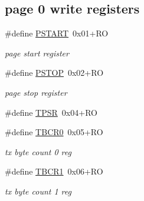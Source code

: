 \subsection*{page 0 write registers}
\begin{DoxyCompactItemize}
\item 
\mbox{\label{group__gumstix__dp8390_gab1092823cdaee6ba848f7ce332b9cff6}} 
\#define \mbox{\hyperlink{group__gumstix__dp8390_gab1092823cdaee6ba848f7ce332b9cff6}{P\+S\+T\+A\+RT}}~0x01+\+RO
\begin{DoxyCompactList}\small\item\em page start register \end{DoxyCompactList}\item 
\mbox{\label{group__gumstix__dp8390_ga52f1617c2c5319e5716083c8f8390ae5}} 
\#define \mbox{\hyperlink{group__gumstix__dp8390_ga52f1617c2c5319e5716083c8f8390ae5}{P\+S\+T\+OP}}~0x02+\+RO
\begin{DoxyCompactList}\small\item\em page stop register \end{DoxyCompactList}\item 
\#define \mbox{\hyperlink{group__gumstix__dp8390_ga3598f69a63ca54d51568ca922c465bcb}{T\+P\+SR}}~0x04+\+RO
\item 
\mbox{\label{group__gumstix__dp8390_ga01d9b9c2500e532aa31bcc7556858f7e}} 
\#define \mbox{\hyperlink{group__gumstix__dp8390_ga01d9b9c2500e532aa31bcc7556858f7e}{T\+B\+C\+R0}}~0x05+\+RO
\begin{DoxyCompactList}\small\item\em tx byte count 0 reg \end{DoxyCompactList}\item 
\mbox{\label{group__gumstix__dp8390_gab506a14308ecf15fa20db17e9e778902}} 
\#define \mbox{\hyperlink{group__gumstix__dp8390_gab506a14308ecf15fa20db17e9e778902}{T\+B\+C\+R1}}~0x06+\+RO
\begin{DoxyCompactList}\small\item\em tx byte count 1 reg \end{DoxyCompactList}\item 
\mbox{\label{group__gumstix__dp8390_gae2de4345efe8c5666aa8f8f4d61f7fa0}} 

\end{DoxyCompactItemize}
